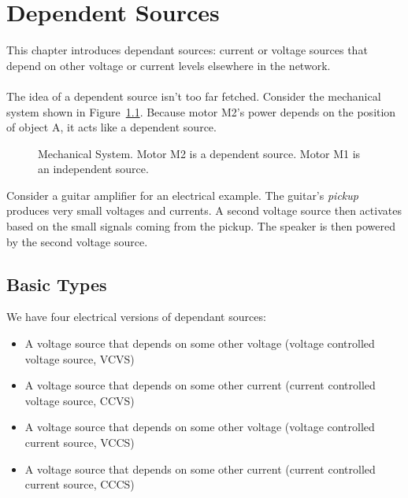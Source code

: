 \chapter{Dependent Sources}
This chapter introduces dependant sources: current or voltage sources that depend on other voltage or current levels elsewhere in the network.\\
\\
The idea of a dependent source isn't too far fetched. Consider the mechanical system shown in Figure~\ref{F:5MDS}. Because motor M2's power depends on the position of object A, it acts like a dependent source.

\begin{figure}[H]
\begin{center}
\caption{Mechanical System. Motor M2 is a dependent source. Motor M1 is an independent source.}
\label{F:5MDS}
\end{center}
\end{figure}

\noindent
Consider a guitar amplifier for an electrical example. The guitar's \emph{pickup} produces very small voltages and currents. A second voltage source then activates based on the small signals coming from the pickup. The speaker is then powered by the second voltage source.\\

\section{Basic Types}
We have four electrical versions of dependant sources:
\begin{itemize}
\item A voltage source that depends on some other voltage (voltage controlled voltage source, VCVS)
\item A voltage source that depends on some other current (current controlled voltage source, CCVS)
\item A voltage source that depends on some other voltage (voltage controlled current source, VCCS)
\item A voltage source that depends on some other current (current controlled current source, CCCS)
\end{itemize}


